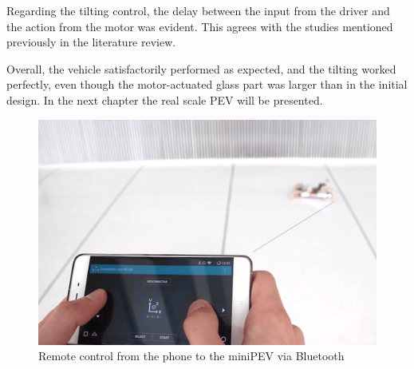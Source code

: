 Regarding the tilting control, the delay between the input from the driver and the action from the motor was evident. This agrees with the studies mentioned previously in the literature review.

Overall, the vehicle satisfactorily performed as expected, and the tilting worked perfectly, even though the motor-actuated glass part was larger than in the initial design. In the next chapter the real scale PEV will be presented.

\begin{figure}[h!]
	\includegraphics[width=1.0\linewidth]{figs/04/remote}
	\caption{Remote control from the phone to the miniPEV via Bluetooth}
\end{figure}

